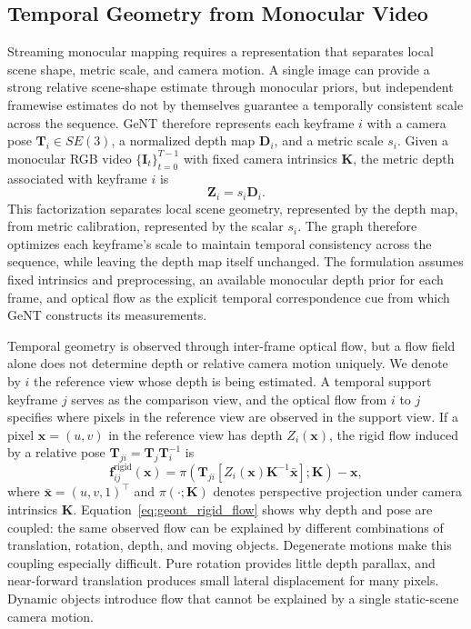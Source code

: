 \subsection{Temporal Geometry from Monocular Video}
Streaming monocular mapping requires a representation that separates local scene shape, metric scale, and camera motion.
A single image can provide a strong relative scene-shape estimate through monocular priors, but independent framewise estimates do not by themselves guarantee a temporally consistent scale across the sequence.
GeNT therefore represents each keyframe $i$ with a camera pose $\bm{T}_i \in SE(3)$, a normalized depth map $\bm{D}_i$, and a metric scale $s_i$.
Given a monocular RGB video $\{\bm{I}_t\}_{t=0}^{T-1}$ with fixed camera intrinsics $\bm{K}$, the metric depth associated with keyframe $i$ is
\begin{equation}
    \bm{Z}_i = s_i \bm{D}_i .
    \label{eq:geont_metric_depth}
\end{equation}
This factorization separates local scene geometry, represented by the depth map, from metric calibration, represented by the scalar $s_i$.
The graph therefore optimizes each keyframe's scale to maintain temporal consistency across the sequence, while leaving the depth map itself unchanged.
The formulation assumes fixed intrinsics and preprocessing, an available monocular depth prior for each frame, and optical flow as the explicit temporal correspondence cue from which GeNT constructs its measurements.

Temporal geometry is observed through inter-frame optical flow, but a flow field alone does not determine depth or relative camera motion uniquely.
We denote by $i$ the reference view whose depth is being estimated.
A temporal support keyframe $j$ serves as the comparison view, and the optical flow from $i$ to $j$ specifies where pixels in the reference view are observed in the support view.
If a pixel $\bm{x}=(u,v)$ in the reference view has depth $Z_i(\bm{x})$, the rigid flow induced by a relative pose $\bm{T}_{ji}=\bm{T}_j \bm{T}_i^{-1}$ is
\begin{equation}
    \bm{f}_{ij}^{\mathrm{rigid}}(\bm{x})
    =
    \pi\!\left(
    \bm{T}_{ji}
    \left[
    Z_i(\bm{x})\bm{K}^{-1}\bar{\bm{x}}
    \right];
    \bm{K}
    \right) - \bm{x},
    \label{eq:geont_rigid_flow}
\end{equation}
where $\bar{\bm{x}}=(u,v,1)^\top$ and $\pi(\cdot;\bm{K})$ denotes perspective projection under camera intrinsics $\bm{K}$.
Equation~\ref{eq:geont_rigid_flow} shows why depth and pose are coupled: the same observed flow can be explained by different combinations of translation, rotation, depth, and moving objects.
Degenerate motions make this coupling especially difficult.
Pure rotation provides little depth parallax, and near-forward translation produces small lateral displacement for many pixels.
Dynamic objects introduce flow that cannot be explained by a single static-scene camera motion.

